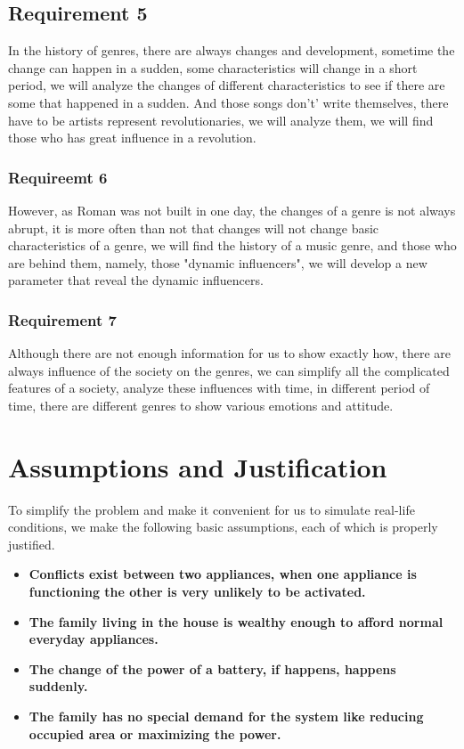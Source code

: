 \documentclass[UTF-8]{article}
\begin{document}
    \subsection{Requirement 5}
    In the history of genres, there are always changes and development, sometime the change can happen in a sudden, some characteristics will change in a short period, 
    we will analyze the changes
    of different characteristics to see if there are some that happened in a sudden. And those songs don't' write themselves,
     there have to be artists represent revolutionaries, we will analyze them, we will find those who has great influence in a revolution.
    \subsubsection{Requireemt 6}
    However, as Roman was not built in one day, the changes of a genre is not always abrupt, it is more often than not that changes will not change basic characteristics of 
    a genre, we will find the history of a music genre, and those who are behind them, namely, those "dynamic influencers", we will develop a new parameter
     that reveal the dynamic influencers.
    \subsubsection{Requirement 7}
    Although there are not enough information for us to show exactly how, there are always influence of the society on the genres, we can simplify all the complicated features
    of a society, analyze these influences with time, in different period of time, there are different genres to show various emotions and attitude.

    \section{Assumptions and Justification}

     To simplify the problem and make it convenient for us to simulate real-life conditions, we make the following basic assumptions, each of which is properly justified.
 
 \begin{itemize}
  \item {\bf Conflicts exist between two appliances, when one appliance is functioning the other is very unlikely to be activated.}
  \item {\bf The family living in the house is wealthy enough to afford normal everyday appliances.}
 
  \item {\bf The change of the power of a battery, if happens,  happens suddenly.}

  \item {\bf The family has no special demand for the system like reducing occupied area or maximizing the power.}

 \end{itemize}
\end{document}
